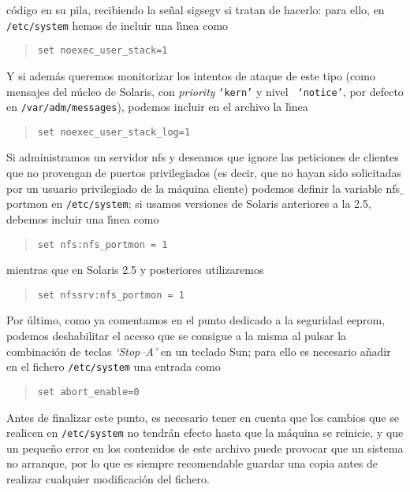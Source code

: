 c\'odigo en su pila, recibiendo la se\~nal {\sc sigsegv} si tratan de hacerlo:
para ello, en {\tt /etc/system} hemos de incluir una l\'{\i}nea como
\begin{quote}
\begin{verbatim}
set noexec_user_stack=1 
\end{verbatim}
\end{quote}
Y si adem\'as queremos monitorizar los intentos de ataque de este tipo (como
mensajes del n\'ucleo de Solaris, con {\it priority} {\tt `kern'} y nivel {\tt
`notice'}, por defecto en {\tt /var/adm/messages}), podemos incluir en el 
archivo la l\'{\i}nea 
\begin{quote}
\begin{verbatim}
set noexec_user_stack_log=1
\end{verbatim}
\end{quote}
Si administramos un servidor {\sc nfs} y deseamos que ignore las peticiones de 
clientes que no 
provengan de puertos privilegiados (es decir, que no hayan sido solicitadas por
un usuario privilegiado de la m\'aquina cliente) podemos definir la variable
{\sc nfs$\_$portmon} en {\tt /etc/system}; si usamos versiones de Solaris 
anteriores a la 2.5, debemos incluir una l\'{\i}nea como
\begin{quote}
\begin{verbatim}
set nfs:nfs_portmon = 1
\end{verbatim}
\end{quote}
mientras que en Solaris 2.5 y posteriores utilizaremos
\begin{quote}
\begin{verbatim}
set nfssrv:nfs_portmon = 1
\end{verbatim}
\end{quote}
Por \'ultimo, como ya comentamos en el punto dedicado a la seguridad {\sc 
eeprom}, podemos
deshabilitar el acceso que se consigue a la misma al pulsar la combinaci\'on
de teclas {\it `Stop--A'} en un teclado Sun; para ello es necesario a\~nadir
en el fichero {\tt /etc/system} una entrada como
\begin{quote}
\begin{verbatim}
set abort_enable=0
\end{verbatim}
\end{quote}
Antes de finalizar este punto, es necesario tener en
cuenta que los cambios que se realicen en {\tt /etc/system} no tendr\'an efecto
hasta que la m\'aquina se reinicie, y que un peque\~no error en los contenidos
de este archivo puede provocar que un sistema no arranque, por lo que es
siempre recomendable guardar una copia antes de realizar cualquier
modificaci\'on del fichero.
